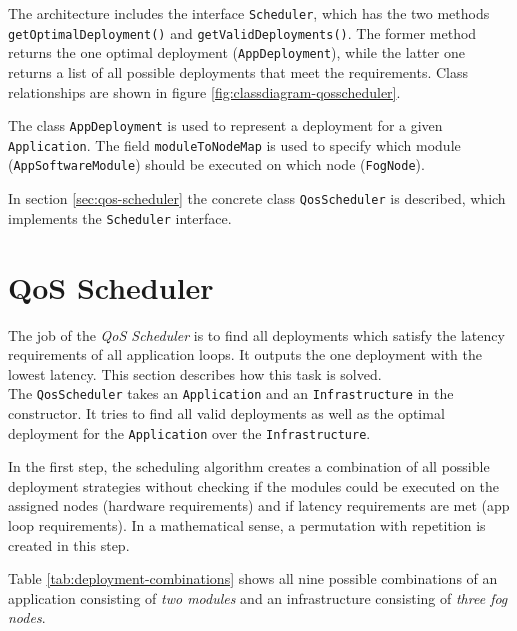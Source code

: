 The architecture includes the interface \texttt{Scheduler}, which has the two methods \texttt{getOptimalDeployment()} and \texttt{getValidDeployments()}. The former method returns the one optimal deployment (\texttt{AppDeployment}), while the latter one returns a list of all possible deployments that meet the requirements. Class relationships are shown in figure \ref{fig:classdiagram-qosscheduler}.

The class \texttt{AppDeployment} is used to represent a deployment for a given \texttt{Application}. The field \texttt{moduleToNodeMap} is used to specify which module (\texttt{AppSoftwareModule}) should be executed on which node (\texttt{FogNode}).

In section \ref{sec:qos-scheduler} the concrete class \texttt{QosScheduler} is described, which implements the \texttt{Scheduler} interface.



\section{QoS Scheduler\label{sec:qos-scheduler}}
The job of the \textit{QoS Scheduler} is to find all deployments which satisfy the latency requirements of all application loops.
It outputs the one deployment with the lowest latency.
This section describes how this task is solved.\\

The \texttt{QosScheduler} takes an \texttt{Application} and an \texttt{Infrastructure} in the constructor.
It tries to find all valid deployments as well as the optimal deployment for the \texttt{Application} over the \texttt{Infrastructure}.

In the first step, the scheduling algorithm creates a combination of all possible deployment strategies without checking if the modules could be executed on the assigned nodes (hardware requirements) and if latency requirements are met (app loop requirements).
In a mathematical sense, a permutation with repetition is created in this step.

Table \ref{tab:deployment-combinations} shows all nine possible combinations of an application consisting of \textit{two modules} and an infrastructure consisting of \textit{three fog nodes}.

